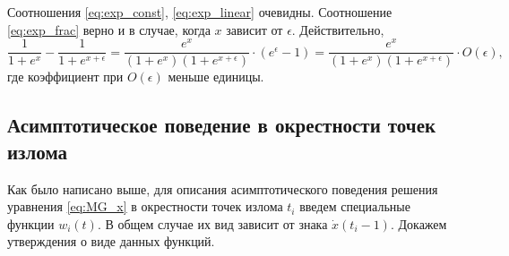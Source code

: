 Соотношения \eqref{eq:exp_const}, \eqref{eq:exp_linear} очевидны. Соотношение \eqref{eq:exp_frac} верно и в случае, когда $x$ зависит от $\epsilon$. Действительно,
%
\[
\dfrac{1}{1 + e^x} - \dfrac{1}{1 + e^{x + \epsilon}} = \dfrac{e^x}{(1 + e^x)(1 + e^{x + \epsilon})} \cdot (e^{\epsilon} - 1) = \dfrac{e^x}{(1 + e^x)(1 + e^{x + \epsilon})} \cdot O(\epsilon),
\]
где коэффициент при $O(\epsilon)$ меньше единицы.

\subsection{Асимптотическое поведение в окрестности точек излома}

Как было написано выше, для описания асимптотического поведения решения уравнения \eqref{eq:MG_x} в окрестности точек излома $t_i$ введем специальные функции $w_i(t)$. В общем случае их вид зависит от знака $\dot{x}(t_i - 1)$. Докажем утверждения о виде данных функций.

